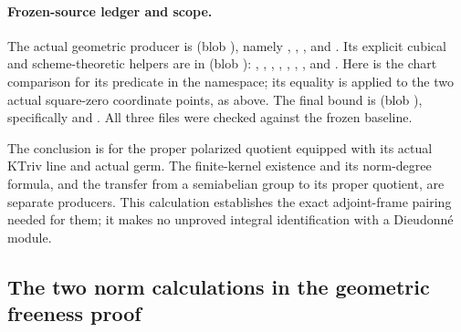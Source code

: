 \paragraph{Frozen-source ledger and scope.}
The actual geometric producer is
\href{https://github.com/ChristianKudeba/alpoge-rh-verification/blob/alpoge-source-7cbf7a0c/src/Development/AutomorphicSpectrum/Proofs/GeometryProofs/ProperGroupGermFiniteSubscheme.lean}
{}
(blob ),
namely , ,
, and .
Its explicit cubical and scheme-theoretic helpers are in
\href{https://github.com/ChristianKudeba/alpoge-rh-verification/blob/alpoge-source-7cbf7a0c/src/Development/WeilBound/CoreStatements/TorusUniformisation/ChowMahlerFamilies/KernelRankMultiplicationCharP.lean}
{}
(blob ):
, , ,
, , ,
, and .
Here  is the chart comparison for its
 predicate in the  namespace;
its equality is applied to the two actual square-zero coordinate
points, as above.
The final bound is
\href{https://github.com/ChristianKudeba/alpoge-rh-verification/blob/alpoge-source-7cbf7a0c/src/Development/AutomorphicSpectrum/Proofs/GeometryProofs/ProperMultiplicationKernel.lean}
{}
(blob ),
specifically  and
.
All three files were checked against the frozen baseline.

The conclusion is for the proper polarized quotient equipped with
its actual \(\mathrm{KTriv}\) line and actual germ.
The finite-kernel existence and its norm-degree formula, and the
transfer from a semiabelian group to its proper quotient, are
separate producers.  This calculation establishes the exact
adjoint-frame pairing needed for them; it makes no unproved
integral identification with a Dieudonn\'e module.


\subsection{The two norm calculations in the geometric freeness proof}
\label{subsec:faithful-free-norm-calculations}

